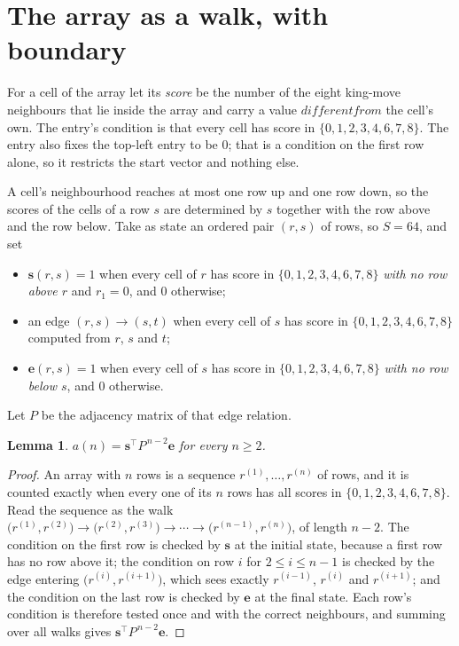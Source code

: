 \documentclass[11pt,a4paper]{article}
\theoremstyle{plain}
\newtheorem{lemma}[theorem]{Lemma}
\theoremstyle{definition}
\begin{document}
\section{The array as a walk, with boundary}

For a cell of the array let its \emph{score} be the number of the eight king-move neighbours that lie inside
the array and carry a value $different from$ the cell's own. The entry's condition is that every cell
has score in $\{0,1,2,3,4,6,7,8\}$. The entry also fixes the top-left entry to be $0$; that is a condition on the first row alone, so it restricts the start vector and nothing else.

A cell's neighbourhood reaches at most one row up and one row down, so the scores of the
cells of a row $s$ are determined by $s$ together with the row above and the row below.
Take as state an ordered pair $(r,s)$ of rows, so $S=64$, and set
\begin{itemize}
\item $\mathbf{s}(r,s)=1$ when every cell of $r$ has score in $\{0,1,2,3,4,6,7,8\}$ \emph{with no row
above $r$} and $r_1=0$, and $0$ otherwise;
\item an edge $(r,s)\to(s,t)$ when every cell of $s$ has score in $\{0,1,2,3,4,6,7,8\}$ computed from
$r$, $s$ and $t$;
\item $\mathbf{e}(r,s)=1$ when every cell of $s$ has score in $\{0,1,2,3,4,6,7,8\}$ \emph{with no row
below $s$}, and $0$ otherwise.
\end{itemize}
Let $P$ be the adjacency matrix of that edge relation.

\begin{lemma}\label{lem:walk}
$a(n)=\mathbf{s}^{\!\top}P^{\,n-2}\mathbf{e}$ for every $n\ge2$.
\end{lemma}

\begin{proof}
An array with $n$ rows is a sequence $r^{(1)},\dots,r^{(n)}$ of rows, and it is counted
exactly when every one of its $n$ rows has all scores in $\{0,1,2,3,4,6,7,8\}$. Read the sequence as the
walk $\bigl(r^{(1)},r^{(2)}\bigr)\to\bigl(r^{(2)},r^{(3)}\bigr)\to\cdots\to
\bigl(r^{(n-1)},r^{(n)}\bigr)$, of length $n-2$. The condition on the first row is
checked by $\mathbf{s}$ at the initial state, because a first row has no row above it; the
condition on row $i$ for $2\le i\le n-1$ is checked by the edge entering
$\bigl(r^{(i)},r^{(i+1)}\bigr)$, which sees exactly $r^{(i-1)}$, $r^{(i)}$ and
$r^{(i+1)}$; and the condition on the last row is checked by $\mathbf{e}$ at the final
state. Each row's condition is therefore tested once and with the correct neighbours, and
summing over all walks gives $\mathbf{s}^{\!\top}P^{\,n-2}\mathbf{e}$.
\end{proof}
\end{document}

